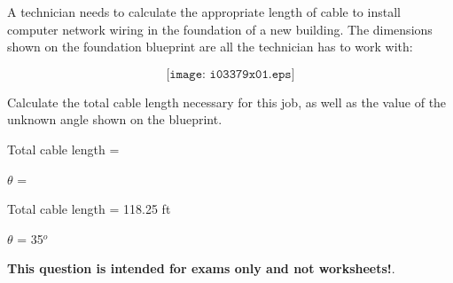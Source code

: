 

A technician needs to calculate the appropriate length of cable to install computer network wiring in the foundation of a new building.  The dimensions shown on the foundation blueprint are all the technician has to work with:

$$\texttt{[image: i03379x01.eps]}$$

Calculate the total cable length necessary for this job, as well as the value of the unknown angle shown on the blueprint.

\vskip 20pt

Total cable length = 

\vskip 10pt

$\theta$ = 







Total cable length = 118.25 ft

\vskip 10pt

$\theta$ = 35$^{o}$







{\bf This question is intended for exams only and not worksheets!}.




